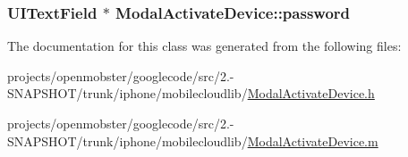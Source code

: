 \label{interface_modal_activate_device_a9bd94759994e7438c4938020a2dc9f5f}
\hypertarget{interface_modal_activate_device_aaf0bb5384eb5a0f7e646bfcb63ef16c4}{
\subsubsection[{password}]{\setlength{\rightskip}{0pt plus 5cm}\-U\-I\-Text\-Field $\ast$ \-Modal\-Activate\-Device\-::password}}
\label{interface_modal_activate_device_aaf0bb5384eb5a0f7e646bfcb63ef16c4}


\-The documentation for this class was generated from the following files\-:\begin{DoxyCompactItemize}
\item 
projects/openmobster/googlecode/src/2.-\/\-S\-N\-A\-P\-S\-H\-O\-T/trunk/iphone/mobilecloudlib/\hyperlink{_modal_activate_device_8h}{\-Modal\-Activate\-Device.\-h}\item 
projects/openmobster/googlecode/src/2.-\/\-S\-N\-A\-P\-S\-H\-O\-T/trunk/iphone/mobilecloudlib/\hyperlink{_modal_activate_device_8m}{\-Modal\-Activate\-Device.\-m}\end{DoxyCompactItemize}
